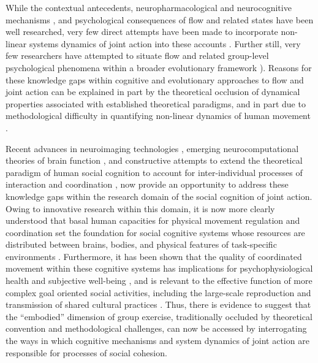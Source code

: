 While the contextual antecedents\citep{Fong2015}, neuropharmacological \citep{Boecker2008} and neurocognitive mechanisms \citep{Dietrich2004,Dietrich2011,Cheron2016}, and psychological consequences \citep{Wheatley2012} of flow and related states have been well researched, very few direct attempts have been made to incorporate non-linear systems dynamics of joint action into these accounts \citep[but see][]{Marsh2009}.  Further still, very few researchers have attempted to situate flow and related group-level psychological phenomena within a broader evolutionary framework \citep[but, for a general theoretical proposal, see][]{Slingerland2014}).  Reasons for these knowledge gaps within cognitive and evolutionary approaches to flow and joint action can be explained in part by the theoretical occlusion of dynamical properties associated with established theoretical paradigms, and in part due to methodological difficulty in quantifying non-linear dynamics of human movement \citep{Kelso2009}.

Recent advances in neuroimaging technologies \citep{Frith2007}, emerging neurocomputational theories of brain function \citep{Friston2010,Frith2010,Clark2013}, and constructive attempts to extend the theoretical paradigm of human social cognition to account for inter-individual processes of interaction and coordination \citep{Sebanz2006,Dale2014}, now provide an opportunity to address these knowledge gaps within the research domain of the social cognition of joint action.  Owing to innovative research within this domain, it is now more clearly understood that basal human capacities for physical movement regulation and coordination set the foundation for social cognitive systems whose resources are distributed between brains, bodies, and physical features of task-specific environments \citep{Hutchins2000,Kirsh2006,Semin2008,Semin2012,Coey2012}.
Furthermore, it has been shown that the quality of coordinated movement within these cognitive systems has implications for psychophysiological health and subjective well-being \citep{Wheatley2012}, and is relevant to the effective function of more complex goal oriented social activities, including the large-scale reproduction and transmission of shared cultural practices \citep{Dunbar2012,Roepstorff2010,Claidiere2014,Launay2016}. Thus, there is evidence to suggest that the ``embodied'' dimension of group exercise, traditionally occluded by theoretical convention and methodological challenges, can now be accessed by  interrogating the ways in which cognitive mechanisms and system dynamics of joint action are responsible for processes of social cohesion.

